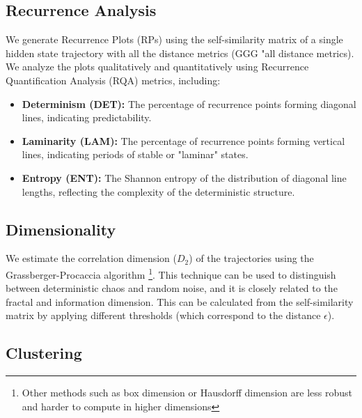 \documentclass[a4paper,12pt]{article}
\begin{document}
\subsection{Recurrence Analysis}
We generate Recurrence Plots (RPs) using the self-similarity matrix of a single hidden state trajectory with all the distance metrics (GGG "all distance metrics). We analyze the plots qualitatively and quantitatively using Recurrence Quantification Analysis (RQA) metrics, including:
\begin{itemize}
    \item \textbf{Determinism (DET):} The percentage of recurrence points forming diagonal lines, indicating predictability.
    \item \textbf{Laminarity (LAM):} The percentage of recurrence points forming vertical lines, indicating periods of stable or "laminar" states.
    \item \textbf{Entropy (ENT):} The Shannon entropy of the distribution of diagonal line lengths, reflecting the complexity of the deterministic structure.
\end{itemize} %




\subsection{Dimensionality}
We estimate the correlation dimension ($D_2$) of the trajectories using the Grassberger-Procaccia algorithm \cite{GRASSBERGER1983189} \footnote{Other methods such as box dimension or Hausdorff dimension are less robust and harder to compute in higher dimensions}. This technique can be used to distinguish between deterministic chaos and random noise, and it is closely related to the fractal and information dimension. This can be calculated from the self-similarity matrix by applying different thresholds (which correspond to the distance $\epsilon$). 


\subsection{Clustering}
\end{document}
